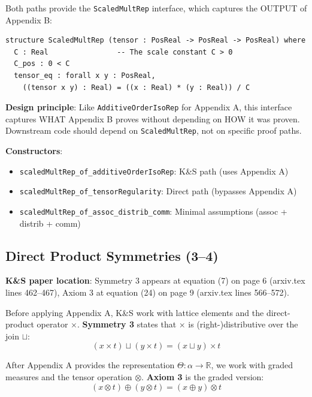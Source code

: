 \documentclass[11pt]{article}
\theoremstyle{definition}
\theoremstyle{remark}
\begin{document}
Both paths provide the \texttt{ScaledMultRep} interface, which captures the OUTPUT of Appendix B:

\begin{lstlisting}[caption={ScaledMultRep interface (\href{https://github.com/zariuq/ks-foundations-of-inference/blob/main/KnuthSkilling/Multiplicative/ScaledMultRep.lean\#L44}{Multiplicative/ScaledMultRep.lean:44})},numbers=none]
structure ScaledMultRep (tensor : PosReal -> PosReal -> PosReal) where
  C : Real                -- The scale constant C > 0
  C_pos : 0 < C
  tensor_eq : forall x y : PosReal,
    ((tensor x y) : Real) = ((x : Real) * (y : Real)) / C
\end{lstlisting}

\textbf{Design principle}: Like \texttt{AdditiveOrderIsoRep} for Appendix A, this interface captures
WHAT Appendix B proves without depending on HOW it was proven. Downstream code should depend on
\texttt{ScaledMultRep}, not on specific proof paths.

\textbf{Constructors}:
\begin{itemize}
\item \texttt{scaledMultRep\_of\_additiveOrderIsoRep}: K\&S path (uses Appendix A)
\item \texttt{scaledMultRep\_of\_tensorRegularity}: Direct path (bypasses Appendix A)
\item \texttt{scaledMultRep\_of\_assoc\_distrib\_comm}: Minimal assumptions (assoc + distrib + comm)
\end{itemize}

\subsection{Direct Product Symmetries (3--4)}

\textbf{K\&S paper location}: Symmetry 3 appears at equation (7) on page 6 (arxiv.tex lines 462--467),
Axiom 3 at equation (24) on page 9 (arxiv.tex lines 566--572).

Before applying Appendix A, K\&S work with lattice elements and the direct-product operator $\times$.
\textbf{Symmetry 3} states that $\times$ is (right-)distributive over the join $\sqcup$:
\[ (x \times t) \sqcup (y \times t) = (x \sqcup y) \times t \]

After Appendix A provides the representation $\Theta : \alpha \to \mathbb{R}$, we work with
graded measures and the tensor operation $\otimes$. \textbf{Axiom 3} is the graded version:
\[ (x \otimes t) \oplus (y \otimes t) = (x \oplus y) \otimes t \]
\end{document}
